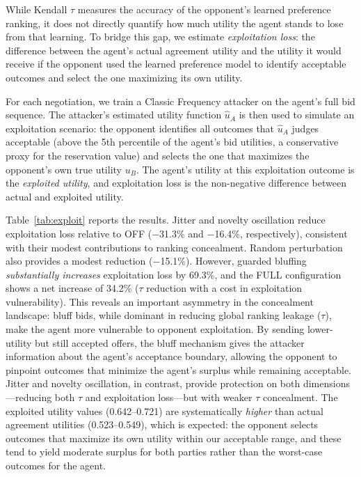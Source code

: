 \documentclass[runningheads]{llncs}
\begin{document}
While Kendall $\tau$ measures the accuracy of the opponent's learned preference ranking, it does not directly quantify how much utility the agent stands to lose from that learning. To bridge this gap, we estimate \emph{exploitation loss}: the difference between the agent's actual agreement utility and the utility it would receive if the opponent used the learned preference model to identify acceptable outcomes and select the one maximizing its own utility.

For each negotiation, we train a Classic Frequency attacker on the agent's full bid sequence. The attacker's estimated utility function $\hat{u}_A$ is then used to simulate an exploitation scenario: the opponent identifies all outcomes that $\hat{u}_A$ judges acceptable (above the 5th percentile of the agent's bid utilities, a conservative proxy for the reservation value) and selects the one that maximizes the opponent's own true utility $u_B$. The agent's utility at this exploitation outcome is the \emph{exploited utility}, and exploitation loss is the non-negative difference between actual and exploited utility.

Table~\ref{tab:exploit} reports the results.
Jitter and novelty oscillation reduce exploitation loss relative to OFF ($-$31.3\% and $-$16.4\%, respectively), consistent with their modest contributions to ranking concealment. Random perturbation also provides a modest reduction ($-$15.1\%). However, guarded bluffing \emph{substantially increases} exploitation loss by 69.3\%, and the FULL configuration shows a net increase of 34.2\% ($\tau$ reduction with a cost in exploitation vulnerability). This reveals an important asymmetry in the concealment landscape: bluff bids, while dominant in reducing global ranking leakage ($\tau$), make the agent more vulnerable to opponent exploitation. By sending lower-utility but still accepted offers, the bluff mechanism gives the attacker information about the agent's acceptance boundary, allowing the opponent to pinpoint outcomes that minimize the agent's surplus while remaining acceptable. Jitter and novelty oscillation, in contrast, provide protection on both dimensions—reducing both $\tau$ and exploitation loss—but with weaker $\tau$ concealment. The exploited utility values (0.642--0.721) are systematically \emph{higher} than actual agreement utilities (0.523--0.549), which is expected: the opponent selects outcomes that maximize its own utility within our acceptable range, and these tend to yield moderate surplus for both parties rather than the worst-case outcomes for the agent.
\end{document}
